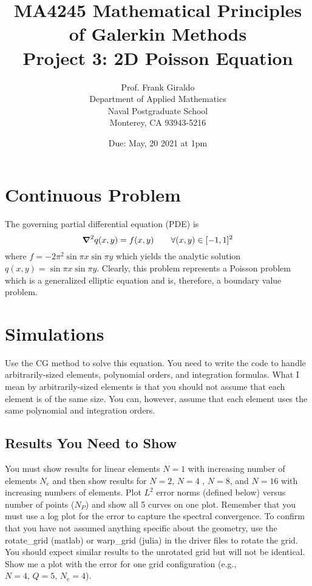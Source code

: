 \documentclass[10pt]{article}
\newcommand{\vc}[1]{\mbox{\boldmath$#1$\unboldmath}}
\newcommand{\grad}{\vc{\nabla}}
\begin{document}
\title{MA4245 Mathematical Principles of Galerkin Methods \\
Project 3: 2D Poisson Equation}
\author{Prof. Frank Giraldo \\
Department of Applied Mathematics \\
Naval Postgraduate School \\
Monterey, CA 93943-5216}
\date{Due: May, 20 2021 at 1pm}
\maketitle

\section{Continuous Problem}
The governing partial differential equation (PDE) is
\[
\grad^2 q(x,y) = f(x,y) \qquad \forall (x,y) \in [-1,1]^2
\]
where $f=-2 \pi^2 \sin \pi x \sin \pi y$ which yields the analytic solution $q(x,y) = \sin \pi x \sin \pi y$. 
Clearly, this problem represents a Poisson problem which is a generalized elliptic equation and is, therefore, a boundary value problem. 

\section{Simulations}
Use the CG  method to solve this equation. 
You need to write the code to handle arbitrarily-sized elements, polynomial orders, and integration formulas. What I mean by arbitrarily-sized elements is that you should not assume that each element is of the same size. 
You can, however, assume that each element uses the same polynomial and integration orders.

\subsection{Results You Need to Show}
You must show results for linear elements $N=1$ with increasing number of elements $N_e$ and then show results for 
$N=2$, $N=4$ , $N=8$, and $N=16$ with increasing numbers of elements. Plot $L^2$ error norms (defined below) versus number of points ($N_P$) and show all 5 curves on one plot. Remember that you must use 
a log plot for the error to capture the spectral convergence. To confirm that you have not assumed anything specific about the geometry, use the rotate\_grid (matlab) or warp\_grid (julia) in the driver files to rotate the grid.  You should expect similar results to the unrotated grid but will not be identical.  Show me a plot with the error for one grid configuration (e.g., $N=4, \,Q=5, \, N_e=4$).
\end{document}
